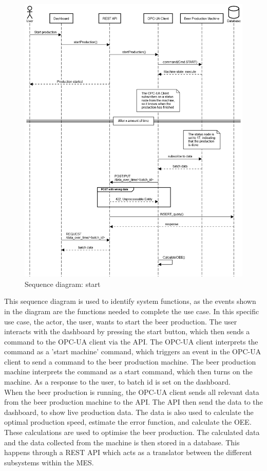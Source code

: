\begin{figure}[H]
\centering 
\includegraphics[width=1\linewidth]{images/sequence_operation/start.png}
\caption{Sequence diagram: start}
\label{figure:sequence_diagram} 
\end{figure}

This sequence diagram is used to identify system functions, as the events shown
in the diagram are the functions needed to complete the use case. In this
specific use case, the actor, the user, wants to start the beer production.
The user interacts with the dashboard by pressing the start button,
which then sends a command to the OPC-UA client via the API. The OPC-UA client
interprets the command as a 'start machine' command, which triggers an event in
the OPC-UA client to send a command to the beer production machine. The beer
production machine interprets the command as a start command, which then turns
on the machine. As a response to the user, to batch id is set on the dashboard.\\

When the beer production is running, the OPC-UA client sends all relevant
data from the beer production machine to the API. The API then send the data to
the dashboard, to show live production data. The data is also used to calculate
the optimal production speed, estimate the error function, and calculate the OEE.
These calculations are used to optimise the beer production. The calculated data
and the data collected from the machine is then stored in a database. This
happens through a REST API which acts as a translator between the different 
subsystems within the MES.

